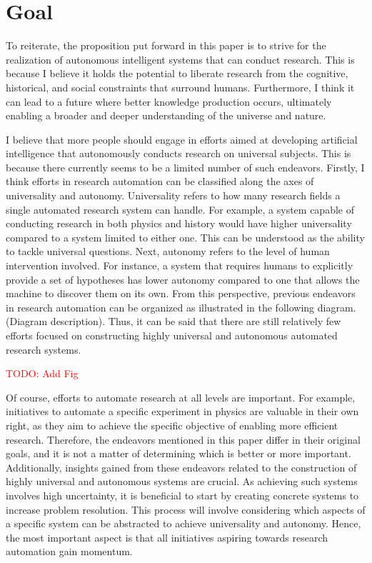 \documentclass{book}
\begin{document}
\section{Goal}
To reiterate, the proposition put forward in this paper is to strive for the realization of autonomous intelligent systems that can conduct research. This is because I believe it holds the potential to liberate research from the cognitive, historical, and social constraints that surround humans. Furthermore, I think it can lead to a future where better knowledge production occurs, ultimately enabling a broader and deeper understanding of the universe and nature.

I believe that more people should engage in efforts aimed at developing artificial intelligence that autonomously conducts research on universal subjects. This is because there currently seems to be a limited number of such endeavors. Firstly, I think efforts in research automation can be classified along the axes of universality and autonomy. Universality refers to how many research fields a single automated research system can handle. For example, a system capable of conducting research in both physics and history would have higher universality compared to a system limited to either one. This can be understood as the ability to tackle universal questions. Next, autonomy refers to the level of human intervention involved. For instance, a system that requires humans to explicitly provide a set of hypotheses has lower autonomy compared to one that allows the machine to discover them on its own. From this perspective, previous endeavors in research automation can be organized as illustrated in the following diagram. (Diagram description). Thus, it can be said that there are still relatively few efforts focused on constructing highly universal and autonomous automated research systems.

\textcolor{red}{TODO: Add Fig}

Of course, efforts to automate research at all levels are important. For example, initiatives to automate a specific experiment in physics are valuable in their own right, as they aim to achieve the specific objective of enabling more efficient research. Therefore, the endeavors mentioned in this paper differ in their original goals, and it is not a matter of determining which is better or more important. Additionally, insights gained from these endeavors related to the construction of highly universal and autonomous systems are crucial. As achieving such systems involves high uncertainty, it is beneficial to start by creating concrete systems to increase problem resolution. This process will involve considering which aspects of a specific system can be abstracted to achieve universality and autonomy. Hence, the most important aspect is that all initiatives aspiring towards research automation gain momentum.
\end{document}
